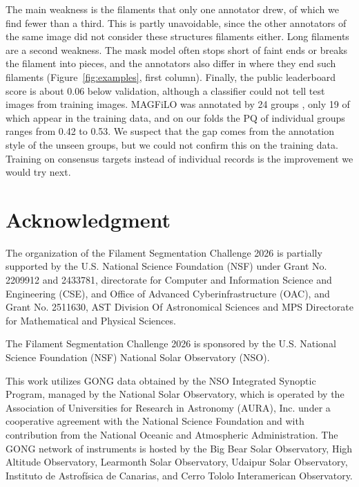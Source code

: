 \documentclass[sigconf,nonacm]{acmart}
\begin{document}
    The main weakness is the filaments that only one annotator drew, of which we find fewer than a third. This is partly unavoidable, since the other annotators of the same image did not consider these structures filaments either. Long filaments are a second weakness. The mask model often stops short of faint ends or breaks the filament into pieces, and the annotators also differ in where they end such filaments (Figure~\ref{fig:examples}, first column). Finally, the public leaderboard score is about 0.06 below validation, although a classifier could not tell test images from training images. MAGFiLO was annotated by 24 groups \cite{ahmadzadeh2024dataset}, only 19 of which appear in the training data, and on our folds the PQ of individual groups ranges from 0.42 to 0.53. We suspect that the gap comes from the annotation style of the unseen groups, but we could not confirm this on the training data. Training on consensus targets instead of individual records is the improvement we would try next.

\section{Acknowledgment}\label{sec:acknowledgment}
    The organization of the Filament Segmentation Challenge 2026 is partially supported by the U.S. National Science Foundation (NSF) under Grant No. 2209912 and 2433781, directorate for Computer and Information Science and Engineering (CSE), and Office of Advanced Cyberinfrastructure (OAC), and Grant No. 2511630, AST Division Of Astronomical Sciences and MPS Directorate for Mathematical and Physical Sciences.

    The Filament Segmentation Challenge 2026 is sponsored by the U.S. National Science Foundation (NSF) National Solar Observatory (NSO).

    This work utilizes GONG data obtained by the NSO Integrated Synoptic Program, managed by the National Solar Observatory, which is operated by the Association of Universities for Research in Astronomy (AURA), Inc. under a cooperative agreement with the National Science Foundation and with contribution from the National Oceanic and Atmospheric Administration. The GONG network of instruments is hosted by the Big Bear Solar Observatory, High Altitude Observatory, Learmonth Solar Observatory, Udaipur Solar Observatory, Instituto de Astrofísica de Canarias, and Cerro Tololo Interamerican Observatory.



\end{document}
